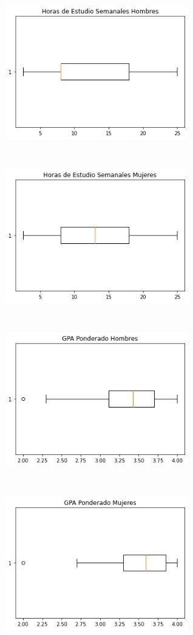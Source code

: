 \documentclass{article}
\begin{document}
\includegraphics[width=8cm, height=7cm]{Horas_hombres}
\includegraphics[width=8cm, height=7cm]{Horas_mujeres}
\includegraphics[width=8cm, height=7cm]{GPA_hombres}
\includegraphics[width=8cm, height=7cm]{GPA_mujeres}
\end{document}
